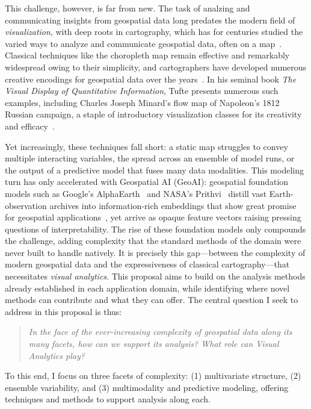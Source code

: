 This challenge, however, is far from new. 
%
The task of analzing and communicating insights from geospatial data long predates the modern field of \emph{visualization}, with deep roots in cartography, which has for centuries studied the varied ways to analyze and communicate geospatial data, often on a map~\cite{bertin1983semiology, Tyner_2014}.
%
Classical techniques like the choropleth map remain effective and remarkably widespread owing to their simplicity, and cartographers have developed numerous creative encodings for geospatial data over the years~\cite{eyton1984complementary,olson1981spectrally,wainer_empirical_1980,strode_exploratory_2020,schloss_mapping_2019}.
%
In his seminal book \emph{The Visual Display of Quantitative Information}, Tufte presents numerous such examples, including Charles Joseph Minard’s flow map of Napoleon’s 1812 Russian campaign, a staple of introductory visualization classes for its creativity and efficacy~\cite{tufte2001visual}.

Yet increasingly, these techniques fall short: a static map struggles to convey multiple interacting variables, the spread across an ensemble of model runs, or the output of a predictive model that fuses many data modalities.
%
This modeling turn has only accelerated with Geospatial AI (GeoAI): geospatial foundation models such as Google's AlphaEarth~\cite{brown_alphaearth_2025} and NASA's Prithvi~\cite{szwarcman2024geospatial} distill vast Earth-observation archives into information-rich embeddings that show great promise for geospatial applications~\cite{bell_earth_2026}, yet arrive as opaque feature vectors raising pressing questions of interpretability.
%
The rise of these foundation models only compounds the challenge, adding complexity that the standard methods of the domain were never built to handle natively.
%
It is precisely this gap---between the complexity of modern geospatial data and the expressiveness of classical cartography---that necessitates \emph{visual analytics}.
%
This proposal aims to build on the analysis methods already established in each application domain, while identifying where novel methods can contribute and what they can offer.
%
The central question I seek to address in this proposal is thus:

\begin{quote}
\emph{In the face of the ever-increasing complexity of geospatial data along its many facets, how can we support its analysis? What role can Visual Analytics play?}
\end{quote}
\noindent
To this end, I focus on three facets of complexity: (1) multivariate structure, (2) ensemble variability, and (3) multimodality and predictive modeling, offering techniques and methods to support analysis along each.

